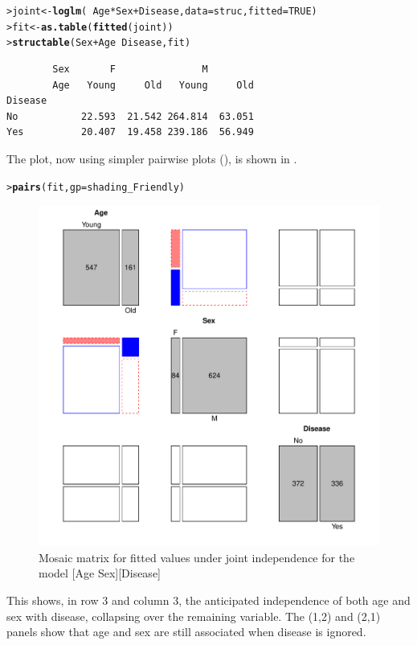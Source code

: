 \documentclass[10pt,krantz2]{krantz}\usepackage[]{graphicx}\usepackage[]{color}
\makeatletter
\newcommand{\hlnum}[1]{\textcolor[rgb]{0.686,0.059,0.569}{#1}}%
\newcommand{\hlopt}[1]{\textcolor[rgb]{0,0,0}{#1}}%
\newcommand{\hlstd}[1]{\textcolor[rgb]{0.345,0.345,0.345}{#1}}%
\newcommand{\hlkwb}[1]{\textcolor[rgb]{0.69,0.353,0.396}{#1}}%
\newcommand{\hlkwc}[1]{\textcolor[rgb]{0.333,0.667,0.333}{#1}}%
\newcommand{\hlkwd}[1]{\textcolor[rgb]{0.737,0.353,0.396}{\textbf{#1}}}%
\newenvironment{kframe}{%
 \def\at@end@of@kframe{}%
 \ifinner\ifhmode%
  \def\at@end@of@kframe{\end{minipage}}%
  \begin{minipage}{\columnwidth}%
 \fi\fi%
 \def\FrameCommand##1{\hskip\@totalleftmargin \hskip-\fboxsep
 \colorbox{shadecolor}{##1}\hskip-\fboxsep
     \hskip-\linewidth \hskip-\@totalleftmargin \hskip\columnwidth}%
 \MakeFramed {\advance\hsize-\width
   \@totalleftmargin\z@ \linewidth\hsize
   \@setminipage}}%
 {\par\unskip\endMakeFramed%
 \at@end@of@kframe}
\newenvironment{knitrout}{}{} %
\renewenvironment{knitrout}{\small\renewcommand{\baselinestretch}{.85}}{} %
\makeatother
\begin{document}
\begin{knitrout}
\color{fgcolor}\begin{kframe}
\begin{alltt}
\hlstd{> }\hlstd{joint} \hlkwb{<-} \hlkwd{loglm}\hlstd{(}\hlopt{~} \hlstd{Age} \hlopt{*} \hlstd{Sex} \hlopt{+} \hlstd{Disease,} \hlkwc{data} \hlstd{= struc,} \hlkwc{fitted} \hlstd{=} \hlnum{TRUE}\hlstd{)}
\hlstd{> }\hlstd{fit} \hlkwb{<-} \hlkwd{as.table}\hlstd{(}\hlkwd{fitted}\hlstd{(joint))}
\hlstd{> }\hlkwd{structable}\hlstd{(Sex} \hlopt{+} \hlstd{Age} \hlopt{~} \hlstd{Disease, fit)}
\end{alltt}
\begin{verbatim}
        Sex       F               M        
        Age   Young     Old   Young     Old
Disease                                    
No           22.593  21.542 264.814  63.051
Yes          20.407  19.458 239.186  56.949
\end{verbatim}
\end{kframe}
\end{knitrout}

The  plot, now using simpler pairwise plots (),
is shown in .
\begin{knitrout}
\color{fgcolor}\begin{kframe}
\begin{alltt}
\hlstd{> }\hlkwd{pairs}\hlstd{(fit,} \hlkwc{gp} \hlstd{= shading_Friendly)}
\end{alltt}
\end{kframe}\begin{figure}[!htb]

\centerline{\includegraphics[width=.7\textwidth]{ch05/fig/struc-mos4-1} }

\caption[Mosaic matrix for fitted values under joint independence]{Mosaic matrix for fitted values under joint independence for the model [Age Sex][Disease]\label{fig:struc-mos4}}
\end{figure}


\end{knitrout}
This shows, in row 3 and column 3, the anticipated independence of both age and sex with
disease, collapsing over the remaining variable.
The (1,2) and (2,1) panels show that age and sex are still associated
when disease is ignored.
\end{document}

